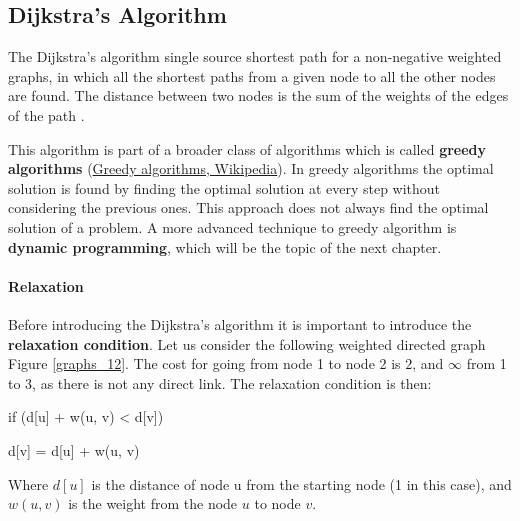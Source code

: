 \subsection{Dijkstra's Algorithm}
\label{sec:dijkstra}
The Dijkstra's algorithm single source shortest path for a non-negative weighted graphs, in which all the shortest paths from a given node to all the other nodes are found. The distance between two nodes is the sum of the weights of the edges of the path \cite{wikidijkstra}.

This algorithm is part of a broader class of algorithms which is called \textbf{greedy algorithms} \cite{wikigreedy} (\href{https://en.wikipedia.org/wiki/Greedy_algorithm}{Greedy algorithms, Wikipedia}). In greedy algorithms the optimal solution is found by finding the optimal solution at every step without considering the previous ones. This approach does not always find the optimal solution of a problem. A more advanced technique to greedy algorithm is \textbf{dynamic programming}, which will be the topic of the next chapter.

\paragraph{Relaxation}
Before introducing the Dijkstra's algorithm it is important to introduce the \textbf{relaxation condition}. Let us consider the following weighted directed graph Figure \ref{graphs_12}. The cost for going from node 1 to node 2 is \(2\), and \(\infty\) from 1 to 3, as there is not any direct link. The relaxation condition is then:

\begin{definition}
\enspace \enspace \textnormal{if (d[u] + w(u, v) < d[v])}

\enspace \enspace \enspace     \textnormal{d[v] = d[u] + w(u, v)}

Where \(d[u]\) is the distance of node u from the starting node (1 in this case), and \(w(u, v)\) is the weight from the node \(u\) to node \(v\).
\end{definition}


